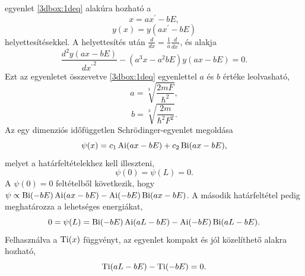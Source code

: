  egyenlet \eqref{3dbox:1deq} alakúra hozható a
\begin{equation}
	x = ax^\prime - bE,
\end{equation}
\begin{equation}
	y(x) = y(ax^\prime - bE)
\end{equation}
helyettesítésekkel. A helyettesítés után $\frac{d}{dx} = \frac{1}{a}\frac{d}{dx^\prime}$, és  alakja
\begin{equation}
	\frac{d^2y(ax-bE)}{{dx^\prime}^2} - \left(a^3x - a^2bE\right)y(ax-bE) = 0.
\end{equation}
Ezt az egyenletet összevetve \eqref{3dbox:1deq} egyenlettel $a$ és $b$ értéke leolvasható,
\begin{equation}
	a = \sqrt[3]{\frac{2mF}{\hbar^2}},
\end{equation}
\begin{equation}
	b = \sqrt[3]{\frac{2m}{\hbar^2F^2}}.
\end{equation}
Az egy dimenziós időfüggetlen Schrödinger-egyenlet megoldása
\begin{equation}
	\psi(x) = c_1\operatorname{Ai}(ax-bE)+c_2\operatorname{Bi}(ax-bE),
\end{equation}
melyet a határfeltételekhez kell illeszteni,
\begin{equation}
	\psi(0) = \psi(L) = 0.
\end{equation}
A $\psi(0) = 0$ feltételből következik, hogy $\psi \propto \operatorname{Bi}(-bE)\operatorname{Ai}(ax-bE) - \operatorname{Ai}(-bE)\operatorname{Bi}(ax-bE)$. A második határfeltétel pedig meghatározza a lehetséges energiákat,
\begin{equation}
		0 = \psi(L) = \operatorname{Bi}(-bE)\operatorname{Ai}(aL-bE) - \operatorname{Ai}(-bE)\operatorname{Bi}(aL-bE).
\end{equation}
Felhasználva a $\operatorname{Ti}(x)$ függvényt, az egyenlet kompakt és jól közelíthető alakra hozható,
\begin{equation}
	\label{box_energiaszintek_egyenlet}
	\operatorname{Ti}(aL-bE) - \operatorname{Ti}(-bE) = 0.
\end{equation}
